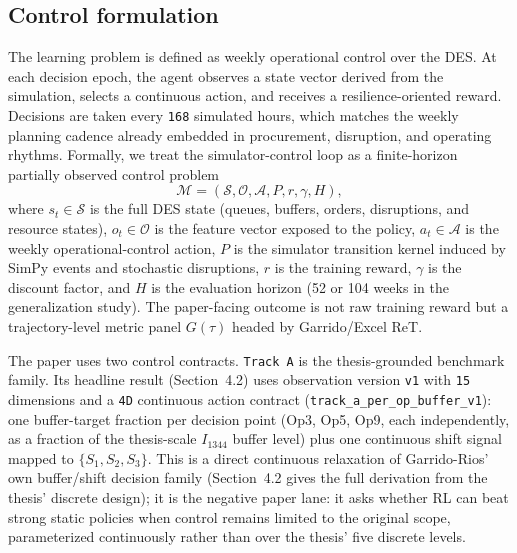 \hypertarget{32-control-formulation}{%
\subsection{Control formulation}\label{32-control-formulation}}

The learning problem is defined as weekly operational control over the
DES. At each decision epoch, the agent observes a state vector derived
from the simulation, selects a continuous action, and receives a
resilience-oriented reward. Decisions are taken every \texttt{168}
simulated hours, which matches the weekly planning cadence already
embedded in procurement, disruption, and operating rhythms. Formally, we
treat the simulator-control loop as a finite-horizon partially observed
control problem
\begin{equation}
\mathcal{M}=(\mathcal{S},\mathcal{O},\mathcal{A},P,r,\gamma,H),
\label{eq:pomdp}
\end{equation}
where $s_t\in\mathcal{S}$ is the full DES state (queues, buffers,
orders, disruptions, and resource states), $o_t\in\mathcal{O}$ is the
feature vector exposed to the policy, $a_t\in\mathcal{A}$ is the
weekly operational-control action, $P$ is the simulator transition
kernel induced by SimPy events and stochastic disruptions, $r$ is the
training reward, $\gamma$ is the discount factor, and $H$ is the
evaluation horizon (52 or 104 weeks in the generalization study). The
paper-facing outcome is not raw training reward but a trajectory-level
metric panel $G(\tau)$ headed by Garrido/Excel ReT.

The paper uses two control contracts. \texttt{Track\ A} is the
thesis-grounded benchmark family. Its headline result (Section~4.2) uses
observation version \texttt{v1} with \texttt{15} dimensions and a
\texttt{4D} continuous action contract (\texttt{track\_a\_per\_op\_buffer\_v1}):
one buffer-target fraction per decision point (Op3, Op5, Op9, each
independently, as a fraction of the thesis-scale $I_{1344}$ buffer level)
plus one continuous shift signal mapped to $\{S_1,S_2,S_3\}$. This is a
direct continuous relaxation of Garrido-Rios' own buffer/shift decision
family (Section~4.2 gives the full derivation from the thesis' discrete
design); it is the negative paper lane: it asks whether RL can beat
strong static policies when control remains limited to the original
scope, parameterized continuously rather than over the thesis' five
discrete levels.

